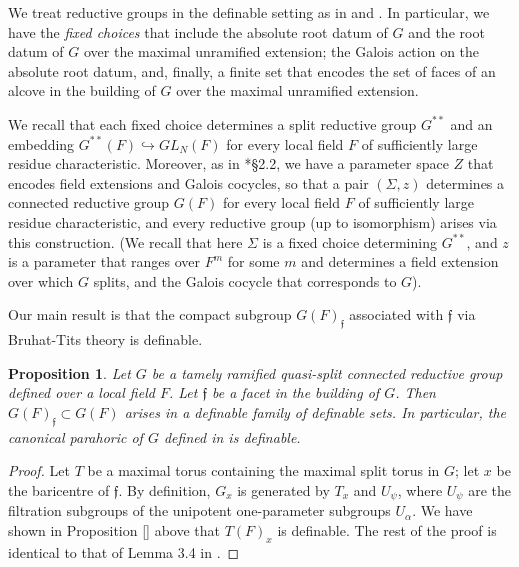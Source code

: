 \documentclass{amsart}
\newcommand{\ff}{{\mathfrak f}}
\theoremstyle{plain}
\newtheorem{prop}[thm]{Proposition}
\theoremstyle{definition}
\begin{document}
We treat reductive groups in the definable setting as in \cite{hales:transfert} and \cite{CGH-2}.
In particular, we have the \emph{fixed choices} that include the absolute root datum of $G$ and the root datum of $G$ over the maximal unramified extension; the Galois action on the absolute root datum, and, finally,  a finite set that encodes the set of faces of an alcove in the building of $G$ over the maximal unramified extension.

We recall that each  fixed choice determines  a split reductive group $G^{\ast\ast}$ and an embedding 
$G^{\ast\ast}(F)\hookrightarrow GL_N(F)$ for every local field $F$ of sufficiently large residue characteristic.  
Moreover, as in \cite{hales:transfert}*{\S 2.2}, we  have a parameter space $Z$ that encodes field extensions and Galois cocycles, so that a pair 
$(\Sigma, z)$ determines a connected reductive group $G(F)$ for every local field $F$ of sufficiently large residue characteristic, and every reductive group (up to isomorphism)  arises via this construction. 
(We recall that here $\Sigma$ is a fixed choice determining $G^{\ast\ast}$, and $z$ is a parameter that ranges over $F^m$ for some $m$ and determines a field extension over which $G$ splits, and the Galois cocycle that corresponds to $G$). 

Our main result is that 
the compact subgroup $G(F)_\ff$ associated with $\ff$ via Bruhat-Tits theory is definable.  


\begin{prop} Let $G$ be a tamely ramified quasi-split connected reductive group defined over a local field $F$. Let $\ff$ be a facet in the building of $G$. 
Then $G(F)_\ff\subset G(F)$ arises in a definable family of definable sets. 
In particular, the canonical parahoric of $G$ defined in \cite{gross:motive} is definable. 
\end{prop}

\begin{proof} Let $T$ be a maximal torus containing the maximal split torus in $G$; let $x$ be the baricentre of $\ff$.
By definition, $G_x$ is generated by $T_x$ and $U_\psi$, where $U_\psi$ are the filtration subgroups of the unipotent one-parameter subgroups $U_{\alpha}$. 
We have shown in Proposition \ref{} above that  $T(F)_x$ is definable. The rest of the proof is identical to that of Lemma 3.4 in \cite{CGH-2}.  
\end{proof} 
\end{document}
